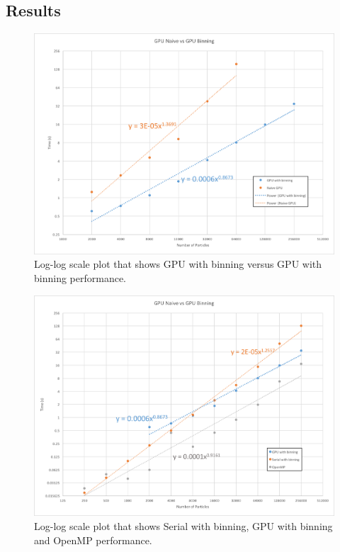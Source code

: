 \documentclass[12pt]{article}
\begin{document}
\subsection{Results}

\begin{figure}
  \centering
  \includegraphics[width=\textwidth]{graphs/gpu_binning_vs_gpu_serial.png}
  \caption{Log-log scale plot that shows GPU with binning versus GPU with binning performance.}
  \label{fig:gpu-compare}
\end{figure}

\begin{figure}
  \centering
  \includegraphics[width=\textwidth]{graphs/serial_openmp_gpu.png}
  \caption{Log-log scale plot that shows Serial with binning, GPU with binning and OpenMP performance.}
  \label{fig:gpu-all}
\end{figure}
\end{document}
